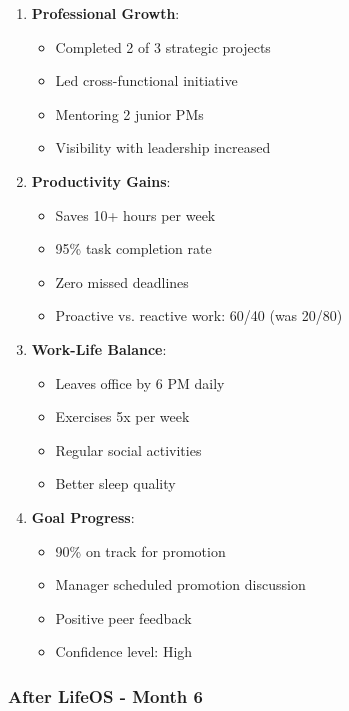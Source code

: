 \begin{enumerate}
    \item \textbf{Professional Growth}:
    \begin{itemize}
        \item Completed 2 of 3 strategic projects
        \item Led cross-functional initiative
        \item Mentoring 2 junior PMs
        \item Visibility with leadership increased
    \end{itemize}
    
    \item \textbf{Productivity Gains}:
    \begin{itemize}
        \item Saves 10+ hours per week
        \item 95\% task completion rate
        \item Zero missed deadlines
        \item Proactive vs. reactive work: 60/40 (was 20/80)
    \end{itemize}
    
    \item \textbf{Work-Life Balance}:
    \begin{itemize}
        \item Leaves office by 6 PM daily
        \item Exercises 5x per week
        \item Regular social activities
        \item Better sleep quality
    \end{itemize}
    
    \item \textbf{Goal Progress}:
    \begin{itemize}
        \item 90\% on track for promotion
        \item Manager scheduled promotion discussion
        \item Positive peer feedback
        \item Confidence level: High
    \end{itemize}
\end{enumerate}

\subsubsection{After LifeOS - Month 6}

